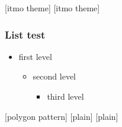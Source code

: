 \documentclass[aspectratio=169, 14pt]{beamer}
\begin{document}
  [itmo theme] %
  [itmo theme] %
  \begin{frame}
    \frametitle{List test}
      \begin{itemize}
        \item first level
        \begin{itemize}
          \item second level
          \begin{itemize}
            \item third level
          \end{itemize}
        \end{itemize}
      \end{itemize}
  \end{frame}

  [polygon pattern]
  [plain]
  [plain]
\end{document}
